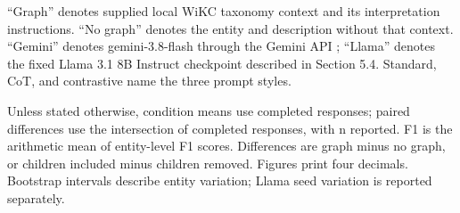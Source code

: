 
“Graph” denotes supplied local WiKC taxonomy context and its interpretation instructions. “No graph” denotes the entity and description without that context. “Gemini” denotes gemini-3.8-flash through the Gemini API \citep{googledeepmind2026}; “Llama” denotes the fixed Llama 3.1 8B Instruct checkpoint described in Section 5.4. Standard, CoT, and contrastive name the three prompt styles.


Unless stated otherwise, condition means use completed responses; paired differences use the intersection of completed responses, with n reported. F1 is the arithmetic mean of entity-level F1 scores. Differences are graph minus no graph, or children included minus children removed. Figures print four decimals. Bootstrap intervals describe entity variation; Llama seed variation is reported separately.

